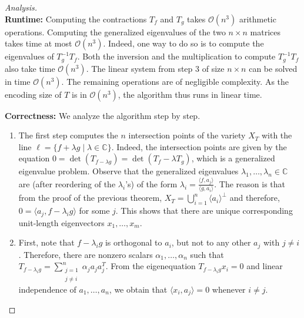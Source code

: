 \begin{proof}[Analysis] ~ \\
	\textbf{Runtime:} Computing the contractions $ T_f $ and $ T_g $ takes $ \mathcal{O}(n^3) $ arithmetic operations. Computing the generalized eigenvalues of the two $ n\times n $ matrices takes time at most $ \mathcal{O}(n^3) $. Indeed, one way to do so is to compute the eigenvalues of $ T_g^{-1}T_f $. Both the inversion and the multiplication to compute $ T_g^{-1}T_f $ also take time $ \mathcal{O}(n^3) $. The linear system from step 3 of size $ n\times n $ can be solved in time $ \mathcal{O}(n^3) $. The remaining operations are of negligible complexity. As the encoding size of $ T $ is in $ \mathcal{O}(n^3) $, the algorithm thus runs in linear time. 
	
	\smallskip\noindent
	\textbf{Correctness: } We analyze the algorithm step by step. 
	\begin{enumerate}
		\item The first step computes the $ n $ intersection points of the variety $ X_T $ with the line $ \ell= \{f+\lambda g \mid \lambda\in \mathbb{C}\} $. Indeed, the intersection points are given by the equation $ 0 = \det(T_{f-\lambda g}) = \det(T_{f} - \lambda T_{g}) $, which is a generalized eigenvalue problem. Observe that the generalized eigenvalues $ \lambda_1,\ldots,\lambda_n \in \mathbb{C} $ are (after reordering of the $ \lambda_i $'s) of the form $ \lambda_i = \frac{\langle f, a_j \rangle}{\langle g,a_i \rangle} $. The reason is that from the proof of the previous theorem, $ X_T = \bigcup_{i = 1}^n \langle a_i \rangle^{\perp} $ and therefore, $ 0 = \langle a_j, f-\lambda_ig \rangle $ for some $ j $. 
		This shows that there are unique corresponding unit-length eigenvectors $ x_1,\ldots,x_m $. 
		\item First, note that $ f-\lambda_ig $ is orthogonal to $ a_i $, but not to any other $ a_j $ with $ j\ne i $. Therefore, there are nonzero scalars $ \alpha_1,\ldots,\alpha_n $ such that $ T_{f-\lambda_ig} = \sum_{\substack{j = 1\\j\ne i}}^{n} \alpha_ja_ja_j^{T}$. From the eigenequation $ T_{f-\lambda_ig} x_i = 0 $ and linear independence of $ a_1,\ldots,a_n $, we obtain that $ \langle x_i, a_j \rangle = 0 $ whenever $ i\ne j $. 
		

\end{enumerate}
\end{proof}
